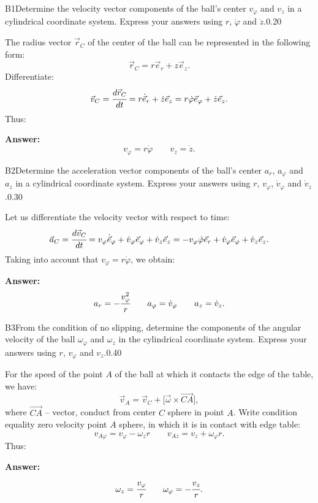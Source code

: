 \documentclass[11pt,a4paper]{article}
\begin{document}
\begin{solcard}{B1}{Determine the velocity vector components of the ball's center $v_\varphi$ and $v_z$ in a cylindrical coordinate system. Express your answers using $r$, $\dot\varphi$ and $\dot{z}$.}{0.20}

The radius vector $\vec{r}_C$ of the center of the ball can be represented in the following form: $$\vec{r}_C=r\vec{e}_r+z\vec{e}_z{.} $$Differentiate: $$\vec{v}_C=\cfrac{d\vec{r}_C}{dt}=r\dot{\vec{e}}_r+\dot{z}\vec{e}_z=r\dot{\varphi}\vec{e}_\varphi+\dot{z}\vec{e}_z{.} $$Thus:

\par\smallskip\noindent\textbf{Answer:} $$v_\varphi=r\dot{\varphi}\qquad v_z=\dot{z}{.} $$
\end{solcard}

\begin{solcard}{B2}{Determine the acceleration vector components of the ball's center $a_r$, $a_\varphi$ and $a_z$ in a cylindrical coordinate system. Express your answers using $r$, $v_\varphi$, $\dot{v}_\varphi$ and $\dot{v}_z$.}{0.30}

Let us differentiate the velocity vector with respect to time: $$\vec{a}_C=\cfrac{d\vec{v}_C}{dt}=v_\varphi\dot{\vec{e}}_\varphi+\dot{v}_\varphi\vec{e}_\varphi+\dot{v}_z\vec{e}_z=-v_\varphi\dot{\varphi}\vec{e}_r+\dot{v}_\varphi\vec{e}_\varphi+\dot{v}_z\vec{e}_z{.} $$Taking into account that $v_\varphi=r\dot{\varphi}$, we obtain:

\par\smallskip\noindent\textbf{Answer:} $$a_r=-\cfrac{v^2_\varphi}{r}\qquad a_\varphi=\dot{v}_\varphi\qquad a_z=\dot{v}_z{.} $$
\end{solcard}

\begin{solcard}{B3}{From the condition of no slipping, determine the components of the angular velocity of the ball $\omega_\varphi$ and $\omega_z$ in the cylindrical coordinate system. Express your answers using $r$, $v_\varphi$ and $v_z$.}{0.40}

For the speed of the point $A$ of the ball at which it contacts the edge of the table, we have: $$\vec{v}_A=\vec{v}_C+\bigl[\vec{\omega}\times\overrightarrow{CA}\bigr]{,} $$where $\overrightarrow{CA}$ – vector, conduct from center $C$ sphere in point $A$. Write condition equality zero velocity point $A$ sphere, in which it is in contact with edge table: $$v_{A\varphi}=v_\varphi-\omega_zr\qquad v_{Az}=v_z+\omega_\varphi r{.} $$Thus:

\par\smallskip\noindent\textbf{Answer:} $$\omega_z=\cfrac{v_\varphi}{r}\qquad \omega_\varphi=-\cfrac{v_z}{r}{.} $$
\end{solcard}
\end{document}
